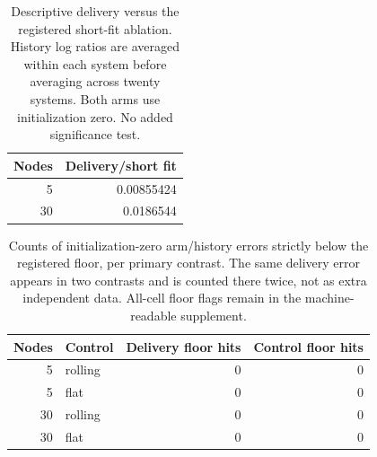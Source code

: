 \begin{table}[ht]
\centering\small
\begin{tabular}{rr}
\toprule
Nodes & Delivery/short fit\\
\midrule
5 & 0.00855424\\
30 & 0.0186544\\
\bottomrule
\end{tabular}
\caption{Descriptive delivery versus the registered short-fit ablation. History log ratios are averaged within each system before averaging across twenty systems. Both arms use initialization zero. No added significance test.}
\end{table}
\begin{table}[ht]
\centering\small
\begin{tabular}{rlrr}
\toprule
Nodes & Control & Delivery floor hits & Control floor hits\\
\midrule
5 & rolling & 0 & 0\\
5 & flat & 0 & 0\\
30 & rolling & 0 & 0\\
30 & flat & 0 & 0\\
\bottomrule
\end{tabular}
\caption{Counts of initialization-zero arm/history errors strictly below the registered floor, per primary contrast. The same delivery error appears in two contrasts and is counted there twice, not as extra independent data. All-cell floor flags remain in the machine-readable supplement.}
\end{table}
\clearpage
